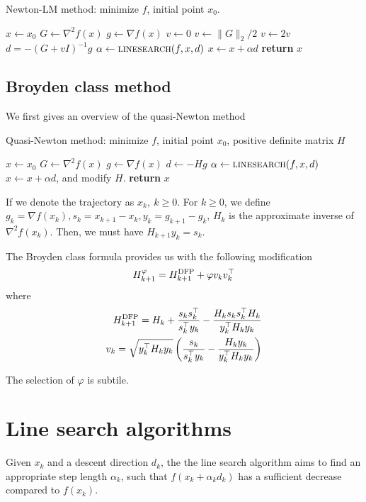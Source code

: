 \documentclass[conference]{IEEEtran}
\begin{document}
\begin{algorithm}
    \caption{Newton-LM method: minimize $f$, initial point $x_0$.}\label{lm}
    \begin{algorithmic}[1]
    \State $x\gets x_0$
    \State $G\gets \nabla^2 f(x)$
    \State $g\gets \nabla f(x)$
    \State $v \gets 0$
    \State $v \gets \|G\|_2/2$
    \Else
    \State $v \gets 2v$
    \EndIf
    \EndWhile
    \State $d = -(G+vI)^{-1}g$
    \State $\alpha \gets {\textsc{linesearch}}(f, x, d)$
    \State $x\gets x+\alpha d$
    \EndWhile
    \State \textbf{return} $x$
    \EndProcedure
    \end{algorithmic}
\end{algorithm}
\newpage
\subsection{Broyden class method}
We first gives an overview of the quasi-Newton method
\begin{algorithm}
    \caption{Quasi-Newton method: minimize $f$, initial point $x_0$, positive definite matrix $H$}\label{newton}
    \begin{algorithmic}[1]
    \State $x\gets x_0$
    \State $G\gets \nabla^2 f(x)$
    \State $g\gets \nabla f(x)$
    \State $d\gets -Hg$
    \State $\alpha \gets {\textsc{linesearch}}(f, x, d)$
    \State $x\gets x+\alpha d$, and modify $H$.
    \EndWhile
    \State \textbf{return} $x$
    \EndProcedure
    \end{algorithmic}
\end{algorithm}

If we denote the trajectory as $x_k, \ k\geq 0$. For $k\geq 0$, we define $g_k=\nabla f(x_k), s_k=x_{k+1}-x_k, y_k=g_{k+1}-g_k$, $H_k$ is the approximate inverse of $\nabla^2 f(x_k)$. Then, we must have $H_{k+1}y_k=s_k$.

The Broyden class formula provides us with the following modification
\begin{equation}
    H_{k+1}^{\varphi} = H^{\rm DFP}_{k+1}+\varphi v_k v_k^\top
\end{equation}
where
\begin{subequations}
    \begin{align}
        H_{k+1}^{\rm DFP}=H_k+\frac{s_k s_k^\top}{s_k^\top y_k}-\frac{H_k s_k s_k^\top H_k}{y_k^\top H_k y_k}\\
        v_k = \sqrt{y_k^\top H_k y_k}\left(\frac{s_k}{s_k^\top y_k}-\frac{H_k y_k}{y_k^\top H_k y_k}\right)
    \end{align}
\end{subequations}

The selection of $\varphi$ is subtile. 


\section{Line search algorithms}
Given $x_k$ and a descent direction $d_k$, the the line search algorithm aims to find an appropriate step length $\alpha_k$, such that $f(x_k+\alpha_k d_k)$ has a sufficient decrease compared to $f(x_k)$.
\end{document}
